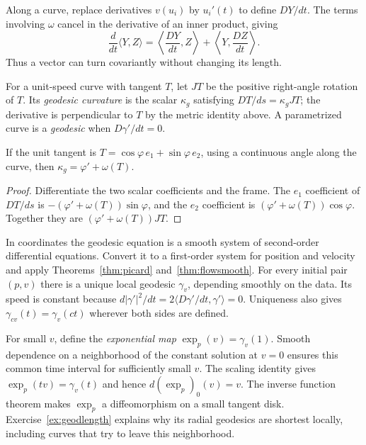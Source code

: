 Along a curve, replace derivatives $v(u_i)$ by $u_i'(t)$ to define $DY/dt$. The terms involving $\omega$ cancel in the derivative of an inner product, giving
\[
\frac d{dt}\langle Y,Z\rangle
=\left\langle\frac{DY}{dt},Z\right\rangle+
\left\langle Y,\frac{DZ}{dt}\right\rangle.
\]
Thus a vector can turn covariantly without changing its length.

\begin{definition}
For a unit-speed curve with tangent $T$, let $JT$ be the positive right-angle rotation of $T$. Its \emph{geodesic curvature} is the scalar $\kappa_g$ satisfying $DT/ds=\kappa_g JT$; the derivative is perpendicular to $T$ by the metric identity above. A parametrized curve is a \emph{geodesic} when $D\gamma'/dt=0$.
\end{definition}

\begin{proposition}\label{prop:kappag}
If the unit tangent is $T=\cos\varphi\,e_1+\sin\varphi\,e_2$, using a continuous angle along the curve, then $\kappa_g=\varphi'+\omega(T)$.
\end{proposition}

\begin{proof}
Differentiate the two scalar coefficients and the frame. The $e_1$ coefficient of $DT/ds$ is $-(\varphi'+\omega(T))\sin\varphi$, and the $e_2$ coefficient is $(\varphi'+\omega(T))\cos\varphi$. Together they are $(\varphi'+\omega(T))JT$.
\end{proof}

In coordinates the geodesic equation is a smooth system of second-order differential equations. Convert it to a first-order system for position and velocity and apply Theorems~\ref{thm:picard} and~\ref{thm:flowsmooth}. For every initial pair $(p,v)$ there is a unique local geodesic $\gamma_v$, depending smoothly on the data. Its speed is constant because $d|\gamma'|^2/dt=2\langle D\gamma'/dt,\gamma'\rangle=0$. Uniqueness also gives $\gamma_{cv}(t)=\gamma_v(ct)$ wherever both sides are defined.

For small $v$, define the \emph{exponential map} $\exp_p(v)=\gamma_v(1)$. Smooth dependence on a neighborhood of the constant solution at $v=0$ ensures this common time interval for sufficiently small $v$. The scaling identity gives $\exp_p(tv)=\gamma_v(t)$ and hence $d(\exp_p)_0(v)=v$. The inverse function theorem makes $\exp_p$ a diffeomorphism on a small tangent disk. Exercise~\ref{ex:geodlength} explains why its radial geodesics are shortest locally, including curves that try to leave this neighborhood.

